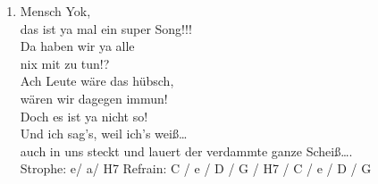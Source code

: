 \begin{guitarMagic}
\begin{enumerate}
        \item Mensch Yok,\\
            das ist ya mal ein super Song!!!\\
            Da haben wir ya alle\\
            nix mit zu tun!?\\
            Ach Leute wäre das hübsch,\\
            wären wir dagegen immun!\\
            Doch es ist ya nicht so!\\
            Und ich sag’s, weil ich’s weiß…\\
            auch in uns steckt und lauert der verdammte ganze Scheiß….\\
            Strophe: e/ a/ H7 Refrain: C / e / D / G / H7 / C / e / D / G
    \end{enumerate}
\end{guitarMagic}

